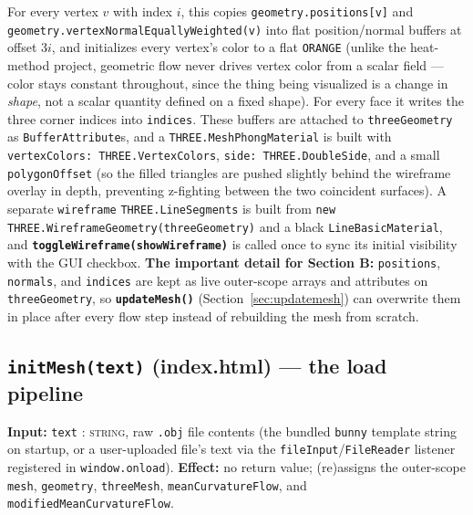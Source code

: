 \documentclass[11pt]{article}
\newcommand{\code}[1]{\texttt{#1}}
\newcommand{\func}[1]{\texttt{\textbf{#1}}}
\newcommand{\type}[1]{\textsc{#1}}
\begin{document}
For every vertex $v$ with index $i$, this copies \code{geometry.positions[v]} and
\code{geometry.vertexNormalEquallyWeighted(v)} into flat position/normal buffers at offset
$3i$, and initializes every vertex's color to a flat \code{ORANGE} (unlike the heat-method
project, geometric flow never drives vertex color from a scalar field --- color stays
constant throughout, since the thing being visualized is a change in \emph{shape}, not a
scalar quantity defined on a fixed shape). For every face it writes the three corner
indices into \code{indices}. These buffers are attached to \code{threeGeometry} as
\code{BufferAttribute}s, and a \code{THREE.MeshPhongMaterial} is built with
\code{vertexColors: THREE.VertexColors}, \code{side: THREE.DoubleSide}, and a small
\code{polygonOffset} (so the filled triangles are pushed slightly behind the wireframe
overlay in depth, preventing z-fighting between the two coincident surfaces). A separate
\code{wireframe} \code{THREE.LineSegments} is built from
\code{new THREE.WireframeGeometry(threeGeometry)} and a black \code{LineBasicMaterial}, and
\func{toggleWireframe(showWireframe)} is called once to sync its initial visibility with
the GUI checkbox. \textbf{The important detail for Section B:} \code{positions},
\code{normals}, and \code{indices} are kept as live outer-scope arrays and attributes on
\code{threeGeometry}, so \func{updateMesh()} (Section~\ref{sec:updatemesh}) can overwrite
them in place after every flow step instead of rebuilding the mesh from scratch.

\subsection{\func{initMesh(text)} (index.html) --- the load pipeline}
\label{sec:initmesh-page}
\textbf{Input:} \code{text} : \type{string}, raw \code{.obj} file contents (the bundled
\code{bunny} template string on startup, or a user-uploaded file's text via the
\code{fileInput}/\code{FileReader} listener registered in \code{window.onload}).
\textbf{Effect:} no return value; (re)assigns the outer-scope \code{mesh}, \code{geometry},
\code{threeMesh}, \code{meanCurvatureFlow}, and \code{modifiedMeanCurvatureFlow}.
\end{document}

